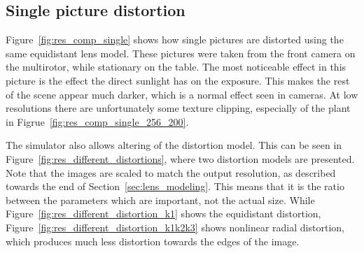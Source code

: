 \subsection{Single picture distortion}

Figure~\ref{fig:res_comp_single} shows how single pictures are distorted using the same equidistant lens model. These pictures were taken from the front camera on the multirotor, while stationary on the table. The most noticeable effect in this picture is the effect the direct sunlight has on the exposure. This makes the rest of the scene appear much darker, which is a normal effect seen in cameras. At low resolutions there are unfortunately some texture clipping, especially of the plant in Figrue~\ref{fig:res_comp_single_256_200}.

The simulator also allows altering of the distortion model. This can be seen in Figure~\ref{fig:res_different_distortions}, where two distortion models are presented. Note that the images are scaled to match the output resolution, as described towards the end of Section~\ref{sec:lens_modeling}. This means that it is the ratio between the parameters which are important, not the actual size. While Figure~\ref{fig:res_different_distortion_k1} shows the equidistant distortion, Figure~\ref{fig:res_different_distortion_k1k2k3} shows nonlinear radial distortion, which produces much less distortion towards the edges of the image.

